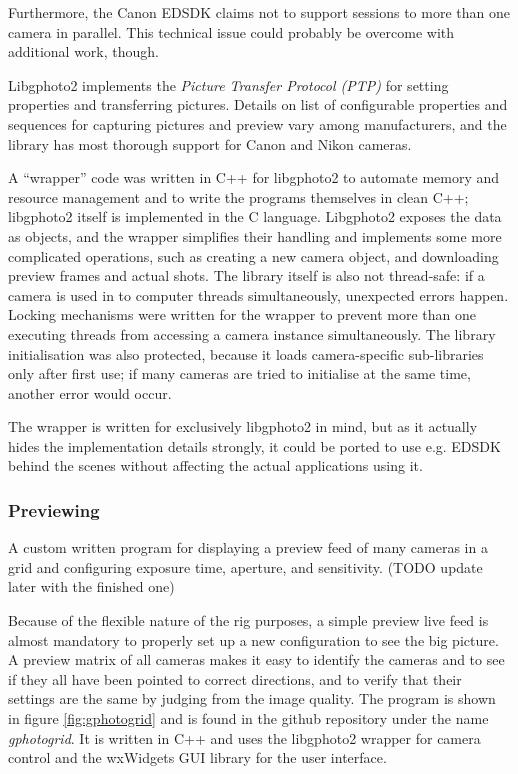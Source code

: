 Furthermore, the Canon EDSDK claims not to support sessions to more than one camera in parallel.
This technical issue could probably be overcome with additional work, though.

Libgphoto2 implements the \emph{Picture Transfer Protocol (PTP)} \cite{ptpTODO} for setting properties and transferring pictures.
Details on list of configurable properties and sequences for capturing pictures and preview vary among manufacturers, and the library has most thorough support for Canon and Nikon cameras.

A ``wrapper'' code was written in C++ for libgphoto2 to automate memory and resource management and to write the programs themselves in clean C++; libgphoto2 itself is implemented in the C language.
Libgphoto2 exposes the data as objects, and the wrapper simplifies their handling and implements some more complicated operations, such as creating a new camera object, and downloading preview frames and actual shots.
The library itself is also not thread-safe: if a camera is used in to computer threads simultaneously, unexpected errors happen.
Locking mechanisms were written for the wrapper to prevent more than one executing threads from accessing a camera instance simultaneously.
The library initialisation was also protected, because it loads camera-specific sub-libraries only after first use; if many cameras are tried to initialise at the same time, another error would occur.

The wrapper is written for exclusively libgphoto2 in mind, but as it actually hides the implementation details strongly, it could be ported to use e.g. EDSDK behind the scenes without affecting the actual applications using it.


\subsubsection{Previewing} %

{A custom written program for displaying a preview feed of many cameras in a grid and configuring exposure time, aperture, and sensitivity. (TODO update later with the finished one)}


Because of the flexible nature of the rig purposes, a simple preview live feed is almost mandatory to properly set up a new configuration to see the big picture.
A preview matrix of all cameras makes it easy to identify the cameras and to see if they all have been pointed to correct directions, and to verify that their settings are the same by judging from the image quality.
The program is shown in figure \ref{fig:gphotogrid} and is found in the github repository under the name \emph{gphotogrid}.
It is written in C++ and uses the libgphoto2 wrapper for camera control and the wxWidgets GUI library for the user interface.

